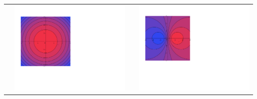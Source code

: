 \documentclass[12pt]{article}
\begin{document}
\begin{enumerate}
\begin{center}
\begin{tabular}{lc|cc}
&\includegraphics[scale=0.45]{matching3.pdf} && \includegraphics[scale=0.49]{matching6.pdf}
\end{tabular}
\end{center}

\newpage


\end{enumerate}
\end{document}

